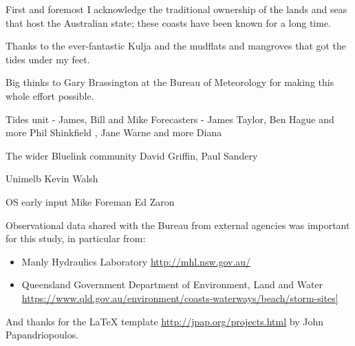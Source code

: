 
\begin{acknowledgements}

{\parindent0pt

First and foremost I acknowledge the traditional ownership of the lands and seas that host the Australian state; these coasts have been known for a long time.
\newline{}

Thanks to the ever-fantastic Kulja and the mudflats and mangroves that got the tides under my feet.   
    
\newline{}    
    
Big thinks to Gary Brassington at the Bureau of Meteorology for making this whole effort possible.

\newline{}
Tides  unit - James, Bill and Mike
Forecasters - James Taylor, Ben Hague and more
Phil Shinkfield , Jane Warne and more
Diana
    
The wider Bluelink community
David Griffin, Paul Sandery    
    
Unimelb
Kevin Walsh

OS early input 
Mike Foreman
Ed Zaron

\newline{}
Observational data shared with the Bureau from external agencies was important for this study, in particular from:
\begin{itemize}
    \item Manly Hydraulics Laboratory \url{http://mhl.nsw.gov.au/}
    \item Queensland Government Department of Environment, Land and Water \url{https://www.qld.gov.au/environment/coasts-waterways/beach/storm-sites]}
\end{itemize}


And thanks for the LaTeX template \url{http://jpap.org/projects.html} by John Papandriopoulos.

}   %
\end{acknowledgements}
